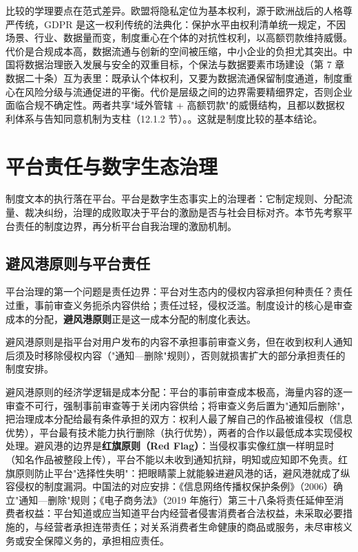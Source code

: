 比较的学理要点在范式差异。欧盟将隐私定位为基本权利，源于欧洲战后的人格尊严传统，GDPR 是这一权利传统的法典化：保护水平由权利清单统一规定，不因场景、行业、数据量而变，制度重心在个体的对抗性权利，以高额罚款维持威慑。代价是合规成本高，数据流通与创新的空间被压缩，中小企业的负担尤其突出。中国将数据治理嵌入发展与安全的双重目标，个保法与数据要素市场建设（第 7 章数据二十条）互为表里：既承认个体权利，又要为数据流通保留制度通道，制度重心在风险分级与流通促进的平衡。代价是层级之间的边界需要精细界定，否则企业面临合规不确定性。两者共享"域外管辖 + 高额罚款"的威慑结构，且都以数据权利体系与告知同意机制为支柱（12.1.2 节）。。这就是制度比较的基本结论。

\section{平台责任与数字生态治理}

制度文本的执行落在平台。平台是数字生态事实上的治理者：它制定规则、分配流量、裁决纠纷，治理的成败取决于平台的激励是否与社会目标对齐。本节先考察平台责任的制度边界，再分析平台自我治理的激励机制。

\subsection{避风港原则与平台责任}

平台治理的第一个问题是责任边界：平台对生态内的侵权内容承担何种责任？责任过重，事前审查义务扼杀内容供给；责任过轻，侵权泛滥。制度设计的核心是审查成本的分配，\textbf{避风港原则}正是这一成本分配的制度化表达。

\begin{definition}
避风港原则是指平台对用户发布的内容不承担事前审查义务，但在收到权利人通知后须及时移除侵权内容（"通知—删除"规则），否则就损害扩大的部分承担责任的制度安排。
\end{definition}

避风港原则的经济学逻辑是成本分配：平台的事前审查成本极高，海量内容的逐一审查不可行，强制事前审查等于关闭内容供给；将审查义务后置为"通知后删除"，把治理成本分配给最有条件承担的双方：权利人最了解自己的作品被谁侵权（信息优势），平台最有技术能力执行删除（执行优势），两者的合作以最低成本实现侵权处理。避风港的边界是\textbf{红旗原则（Red Flag）}：当侵权事实像红旗一样明显时（知名作品被整段上传），平台不能以未收到通知抗辩，明知或应知即不免责。红旗原则防止平台"选择性失明"：把眼睛蒙上就能躲进避风港的话，避风港就成了纵容侵权的制度漏洞。中国法的对应安排：《信息网络传播权保护条例》（2006）确立"通知—删除"规则；《电子商务法》（2019 年施行）第三十八条将责任延伸至消费者权益：平台知道或应当知道平台内经营者侵害消费者合法权益，未采取必要措施的，与经营者承担连带责任；对关系消费者生命健康的商品或服务，未尽审核义务或安全保障义务的，承担相应责任。

